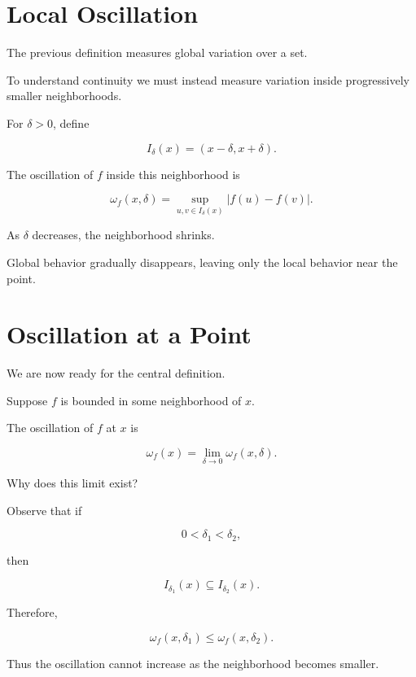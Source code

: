 \documentclass{essay}
\begin{document}

\section{Local Oscillation}

The previous definition measures global variation over a set.

To understand continuity we must instead measure variation inside
progressively smaller neighborhoods.

For $\delta>0$, define

\[
I_\delta(x)
=
(x-\delta,x+\delta).
\]

The oscillation of $f$ inside this neighborhood is

\[
\omega_f(x,\delta)
=
\sup_{u,v\in I_\delta(x)}
|f(u)-f(v)|.
\]

As $\delta$ decreases, the neighborhood shrinks.

Global behavior gradually disappears, leaving only the local behavior near the
point.


\section{Oscillation at a Point}

We are now ready for the central definition.

\begin{definition}

Suppose $f$ is bounded in some neighborhood of $x$.

The oscillation of $f$ at $x$ is

\[
\omega_f(x)
=
\lim_{\delta\to0}
\omega_f(x,\delta).
\]

\end{definition}

Why does this limit exist?

Observe that if

\[
0<\delta_1<\delta_2,
\]

then

\[
I_{\delta_1}(x)
\subseteq
I_{\delta_2}(x).
\]

Therefore,

\[
\omega_f(x,\delta_1)
\le
\omega_f(x,\delta_2).
\]

Thus the oscillation cannot increase as the neighborhood becomes smaller.
\end{document}
